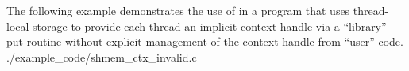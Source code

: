 \begin{apidefinition}
\begin{apiexamples}
    \apicexample
    {The following example demonstrates the use of 
    in a \Cstd[11] program that uses thread-local storage to provide each
    thread an implicit context handle via a ``library'' put routine without
    explicit management of the context handle from ``user'' code.}
    {./example_code/shmem_ctx_invalid.c}
    {}

\end{apiexamples}

\end{apidefinition}

